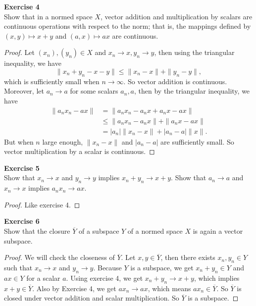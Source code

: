 \documentclass[12pt, a4paper]{article}
\theoremstyle{plain}
\newenvironment{exercise}[2][Exercise]
    { \begin{mdframed}[backgroundcolor=gray!20] \textbf{#1 #2} \\}
    {  \end{mdframed}}
\begin{document}
\begin{exercise}{4}
Show that in a normed space $X$, vector addition and multiplication by scalars are continuous operations with respect to the norm; that is, the mappings defined by $(x,y)\mapsto x+y$ and $(a,x)\mapsto ax$ are continuous.
\end{exercise}
	\begin{proof}
	Let $(x_n),(y_n)\in X$ and $x_n\rightarrow x,y_n\rightarrow y$, then using the triangular inequality, we have
	\[
	\|x_n+y_n-x-y\|\leq \|x_n-x\|+\|y_n-y\|,
	\]
	which is sufficiently small when $n\rightarrow \infty$. So vector addition is continuous. Moreover, let $a_n\rightarrow a$ for some scalars $a_n,a$, then by the triangular inequality, we have
	\begin{align*}
	\|a_nx_n-ax\|&=\|a_nx_n-a_nx+a_nx-ax\|\\
	&\leq \|a_nx_n-a_nx\|+\|a_nx-ax\|\\
	&=|a_n|\|x_n-x\|+|a_n-a|\|x\|.
	\end{align*}
	But when $n$ large enough, $\|x_n-x\|$ and $|a_n-a|$ are sufficiently small. So vector multiplication by a scalar is continuous.
	\end{proof}

\begin{exercise}{5}
Show that $x_n\rightarrow x$ and $y_n\rightarrow y$ implies $x_n+y_n\rightarrow x+y$. Show that $a_n\rightarrow a$ and $x_n\rightarrow x$ implies $a_nx_n\rightarrow ax$.
\end{exercise}
	\begin{proof}
	Like exercise 4.
	\end{proof}

\begin{exercise}{6}
Show that the closure $\overline{Y}$ of a subspace $Y$ of a normed space $X$ is again a vector subspace.
\end{exercise}
	\begin{proof}
	We will check the closeness of $\overline{Y}$. Let $x,y\in \overline{Y}$, then there exists $x_n,y_n\in Y$ such that $x_n\rightarrow x$ and $y_n\rightarrow y$. Because $Y$ is a subspace, we get $x_n+y_n\in Y$ and $ax\in Y$ for a scalar $a$. Using exercise 4, we get $x_n+y_n\rightarrow x+y$, which implies $x+y\in \overline{Y}$. Also by Exercise 4, we get $ax_n\rightarrow ax$, which means $ax_n\in \overline{Y}$. So $\overline{Y}$ is closed under vector addition and scalar multiplication. So $\overline{Y}$ is a subspace.
	\end{proof}
\end{document}
